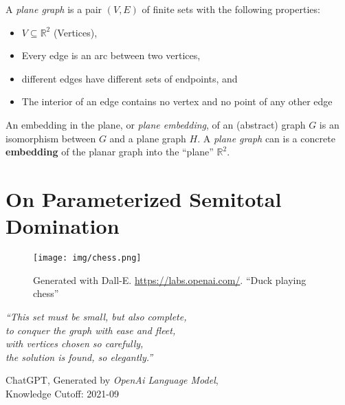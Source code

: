 \begin{graphclass}[Planar]

A \textit{plane graph} is a pair $(V,E)$ of finite sets with the following properties:

\begin{itemize}
    \item $V \subseteq \mathbb{R}^2$ (Vertices),
    \vspace{-2mm}
    \item Every edge is an arc between two vertices, 
    \vspace{-2mm}
    \item different edges have different sets of endpoints, and
    \vspace{-2mm}
    \item The interior of an edge contains no vertex and no point of any other edge
\end{itemize}

An embedding in the plane, or \textit{plane embedding}, of an (abstract) graph $G$ is an isomorphism between $G$ and a plane graph $H$. A \textit{plane graph} can is a concrete \textbf{embedding} of the planar graph into the ``plane'' $\mathbb{R}^2$.

\end{graphclass}



\chapter{On Parameterized Semitotal Domination}\label{ch:semitotal-domination}

\vspace*{-50pt}

\begin{figure}[ht]
        \texttt{[image: img/chess.png]}
        \captionsetup{textformat=empty,labelformat=blank}
        \caption[Generated with Dalle-E. Knowledge Cutoff 09-2022]{Generated with Dall-E. \url{https://labs.openai.com/}. ``Duck playing chess''}
\end{figure}

\epigraph{\itshape ``This set must be small, but also complete, \\ 
to conquer the
graph with ease and fleet, \\
with vertices chosen so carefully, \\
the solution is found, so elegantly.''
}{ChatGPT, Generated by \emph{OpenAi Language Model}, \\
Knowledge Cutoff: 2021-09}

